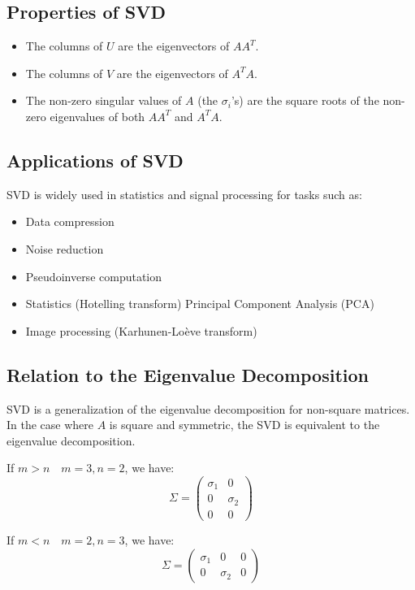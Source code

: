 \documentclass[a4paper, 12pt]{article}
\begin{document}
\subsection{Properties of SVD}
\begin{itemize}
    \item The columns of $U$ are the eigenvectors of $AA^T$.
    \item The columns of $V$ are the eigenvectors of $A^TA$.
    \item The non-zero singular values of $A$ (the $\sigma_i$'s) are the square roots of the non-zero eigenvalues of both $AA^T$ and $A^TA$.
\end{itemize}

\subsection{Applications of SVD}
SVD is widely used in statistics and signal processing for tasks such as:
\begin{itemize}
    \item Data compression
    \item Noise reduction
    \item Pseudoinverse computation
    \item Statistics (Hotelling transform)
    \subitem Principal Component Analysis (PCA)
    \item Image processing (Karhunen-Loève transform)
\end{itemize}

\subsection{Relation to the Eigenvalue Decomposition}
SVD is a generalization of the eigenvalue decomposition for non-square matrices. In the case where $A$ is square and symmetric, the SVD is equivalent to the eigenvalue decomposition.

If $m > n \quad m=3, n=2$, we have:
\[
\Sigma = \begin{pmatrix}
\sigma_1 & 0 \\
0 & \sigma_2 \\
0 & 0
\end{pmatrix}
\]

If $m < n \quad m=2, n=3$, we have:
\[
\Sigma = \begin{pmatrix}
\sigma_1 & 0 & 0 \\
0 & \sigma_2 & 0
\end{pmatrix}
\]
\end{document}
